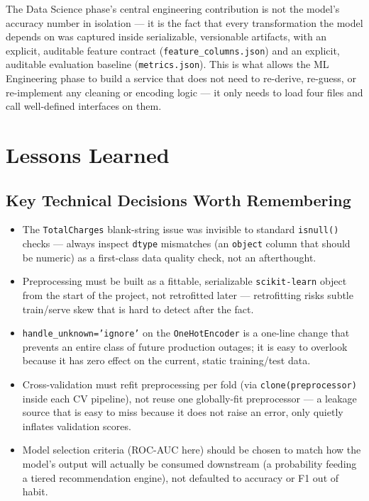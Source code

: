 \documentclass[11pt]{article}
\newcommand{\artifact}[1]{\texttt{\color{navy}#1}}
\begin{document}
The Data Science phase's central engineering contribution is not the model's accuracy number in isolation --- it is the fact that every transformation the model depends on was captured inside serializable, versionable artifacts, with an explicit, auditable feature contract (\artifact{feature\_columns.json}) and an explicit, auditable evaluation baseline (\artifact{metrics.json}). This is what allows the ML Engineering phase to build a service that does not need to re-derive, re-guess, or re-implement any cleaning or encoding logic --- it only needs to load four files and call well-defined interfaces on them.

\section{Lessons Learned}

\subsection{Key Technical Decisions Worth Remembering}

\begin{itemize}[leftmargin=1.4em]
    \item The \artifact{TotalCharges} blank-string issue was invisible to standard \texttt{isnull()} checks --- always inspect \texttt{dtype} mismatches (an \texttt{object} column that should be numeric) as a first-class data quality check, not an afterthought.
    \item Preprocessing must be built as a fittable, serializable \texttt{scikit-learn} object from the start of the project, not retrofitted later --- retrofitting risks subtle train/serve skew that is hard to detect after the fact.
    \item \texttt{handle\_unknown='ignore'} on the \texttt{OneHotEncoder} is a one-line change that prevents an entire class of future production outages; it is easy to overlook because it has zero effect on the current, static training/test data.
    \item Cross-validation must refit preprocessing per fold (via \texttt{clone(preprocessor)} inside each CV pipeline), not reuse one globally-fit preprocessor --- a leakage source that is easy to miss because it does not raise an error, only quietly inflates validation scores.
    \item Model selection criteria (ROC-AUC here) should be chosen to match how the model's output will actually be consumed downstream (a probability feeding a tiered recommendation engine), not defaulted to accuracy or F1 out of habit.
\end{itemize}
\end{document}
